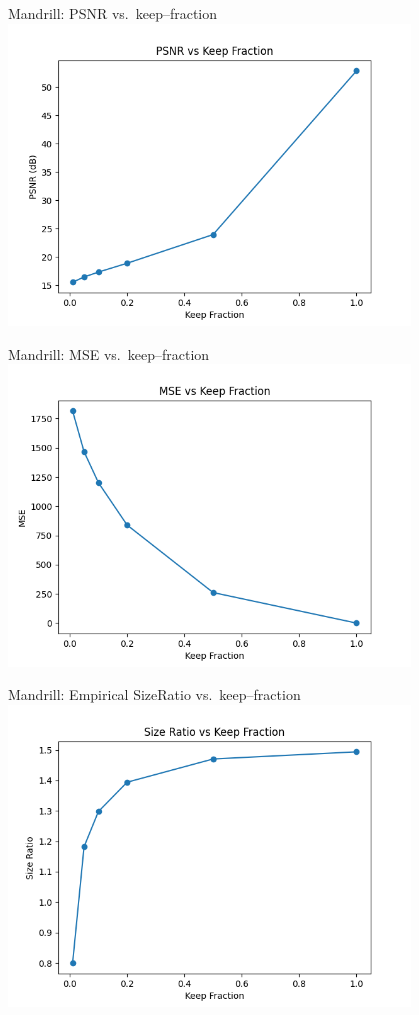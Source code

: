 \documentclass[12pt]{beamer}
\begin{document}
\begin{frame}{Mandrill: PSNR vs.\ keep–fraction}
  \centering
  \includegraphics[width=0.8\textwidth]{psnr_vs_keep_Mandrill.png}
\end{frame}

\begin{frame}{Mandrill: MSE vs.\ keep–fraction}
  \centering
  \includegraphics[width=0.8\textwidth]{mse_vs_keep_Mandrill.png}
\end{frame}

\begin{frame}{Mandrill: Empirical SizeRatio vs.\ keep–fraction}
  \centering
  \includegraphics[width=0.8\textwidth]{size_ratio_vs_keep_Mandrill.png}
\end{frame}
\end{document}
